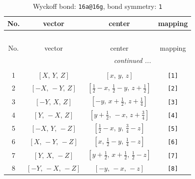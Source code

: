 \documentclass[fleqn,8pt]{jsarticle}
\begin{document}
\begin{longtable}{cccc}
\caption{Wyckoff bond: {\tt 16a@16g}, bond symmetry: {\tt 1}}
 \\
 \hline \hline
No. & vector & center & mapping \\ \hline \endfirsthead

\multicolumn{3}{l}{\tablename\ \thetable{}} \\
 \hline \hline
No. & vector & center & mapping \\ \hline \endhead

 \hline \hline
\multicolumn{3}{r}{\footnotesize\it continued ...} \\ \endfoot

 \hline \hline
\multicolumn{3}{r}{} \\ \endlastfoot

1 & $\left[ X,\, Y,\, Z \right]$ & $\left[ x,\, y,\, z \right]$ & {\tt [1]} \\ \hline
2 & $\left[ - X,\, - Y,\, Z \right]$ & $\left[ \frac{1}{2} - x,\, \frac{1}{2} - y,\, z + \frac{1}{2} \right]$ & {\tt [2]} \\ \hline
3 & $\left[ - Y,\, X,\, Z \right]$ & $\left[ - y,\, x + \frac{1}{2},\, z + \frac{1}{4} \right]$ & {\tt [3]} \\ \hline
4 & $\left[ Y,\, - X,\, Z \right]$ & $\left[ y + \frac{1}{2},\, - x,\, z + \frac{3}{4} \right]$ & {\tt [4]} \\ \hline
5 & $\left[ - X,\, Y,\, - Z \right]$ & $\left[ \frac{1}{2} - x,\, y,\, \frac{3}{4} - z \right]$ & {\tt [5]} \\ \hline
6 & $\left[ X,\, - Y,\, - Z \right]$ & $\left[ x,\, \frac{1}{2} - y,\, \frac{1}{4} - z \right]$ & {\tt [6]} \\ \hline
7 & $\left[ Y,\, X,\, - Z \right]$ & $\left[ y + \frac{1}{2},\, x + \frac{1}{2},\, \frac{1}{2} - z \right]$ & {\tt [7]} \\ \hline
8 & $\left[ - Y,\, - X,\, - Z \right]$ & $\left[ - y,\, - x,\, - z \right]$ & {\tt [8]} \\
\end{longtable}
\end{document}

